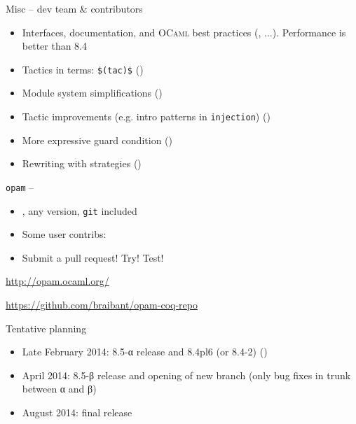 \begin{subsecframefragile}{Misc -- \Coq dev team \& contributors}
  \begin{itemize}
  \item Interfaces, documentation, and \textsc{OCaml} best practices
    (, $\ldots$). \alert{Performance is better than 8.4}
  \item Tactics in terms: \verb|$(tac)$| ()
  \item Module system simplifications ()
  \item Tactic improvements (e.g. intro patterns in \texttt{injection})
    ()
  \item More expressive guard condition ()
  \item Rewriting with strategies ()
  \end{itemize}

\end{subsecframefragile}

\begin{subsecframe}{\texttt{opam} -- }
  
  \begin{itemize}
  \item {}, any version, \texttt{git} included
  \item Some user contribs: 
  \item Submit a pull request! Try! Test!
  \end{itemize}

  \begin{center}
    \url{http://opam.ocaml.org/}
    \vspace{0.5em}

    \url{https://github.com/braibant/opam-coq-repo}
  \end{center}
\end{subsecframe}

\begin{subsecframe}{Tentative planning}
  \begin{itemize}
  \item Late February 2014: 8.5-α release and 8.4pl6 (or 8.4-2) ()
  \item April 2014: 8.5-β release and opening of new branch
    (only bug fixes in trunk between α and β)
  \item August 2014: final release
  \end{itemize}
\end{subsecframe}


